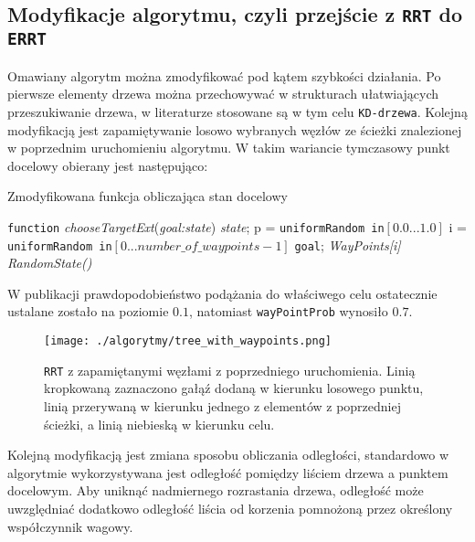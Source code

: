 \subsection{Modyfikacje algorytmu, czyli przejście z \texttt{RRT} do \texttt{ERRT} \label{sec:RRT:extend} }
Omawiany algorytm można zmodyfikować pod kątem szybkości działania. Po pierwsze elementy drzewa można przechowywać w strukturach ułatwiających przeszukiwanie drzewa,
w literaturze stosowane są w tym celu \texttt{KD-drzewa}. Kolejną modyfikacją jest zapamiętywanie losowo wybranych węzłów ze ścieżki znalezionej w poprzednim uruchomieniu
algorytmu. W takim wariancie tymczasowy punkt docelowy obierany jest następująco:
 \begin{algorithm}[H]
	\caption{ Zmodyfikowana funkcja obliczająca stan docelowy }
	\label{alg:chooseTargetExt}
	\begin{algorithmic}
	\STATE \texttt{function} \textit{chooseTargetExt}(\textit{goal:state}) \textit{state};
	\STATE p = \texttt{uniformRandom in}$[0.0 ...1.0]$
	\STATE i = \texttt{uniformRandom in}$[0 ...number\_of\_waypoints -1]$
	  \RETURN  \texttt{goal};
	  \RETURN \textit{WayPoints[i]}
	  \RETURN \textit{RandomState()}
	\ENDIF
	\end{algorithmic}
  \end{algorithm}
W publikacji \cite{RRT} prawdopodobieństwo podążania do właściwego celu ostatecznie ustalane zostało na poziomie $0.1$, natomiast \texttt{wayPointProb} wynosiło $0.7$.
\begin{figure}[h]
\centering
\texttt{[image: ./algorytmy/tree\_with\_waypoints.png]}
\caption{ \texttt{RRT} z zapamiętanymi węzłami z poprzedniego uruchomienia. Linią kropkowaną zaznaczono gałąź dodaną w kierunku losowego punktu,
 linią przerywaną w kierunku jednego z elementów z poprzedniej ścieżki, a linią niebieską w kierunku celu.} \label{fig:tree_with_waypoints}
\end{figure} 
Kolejną modyfikacją jest zmiana sposobu obliczania odległości, standardowo w algorytmie wykorzystywana jest odległość pomiędzy liściem drzewa a punktem docelowym. Aby uniknąć
nadmiernego rozrastania drzewa, odległość może uwzględniać dodatkowo odległość liścia od korzenia pomnożoną przez określony współczynnik wagowy.


